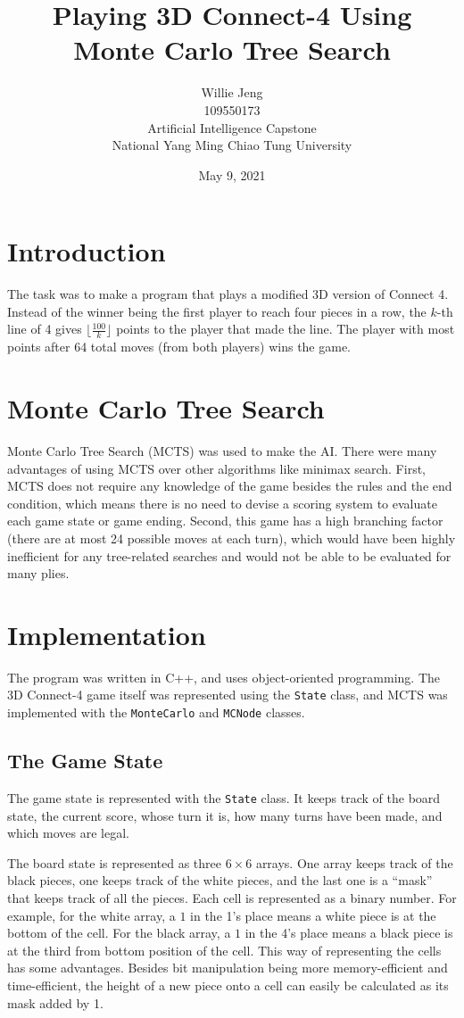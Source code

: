 \documentclass[12pt, a4paper]{article}
\title {
    Playing 3D Connect-4 Using\\
    Monte Carlo Tree Search
}
\author {
    Willie Jeng\\
    109550173\\
    Artificial Intelligence Capstone\\
    National Yang Ming Chiao Tung University\\
}
\date{May 9, 2021}
\begin{document}
    \maketitle

    \section{Introduction}

    The task was to make a program that plays a modified 3D version of Connect 4. Instead of the winner being the first player to reach four pieces in a row, the $k$-th line of 4 gives $\lfloor\frac{100}{k}\rfloor$ points to the player that made the line. The player with most points after 64 total moves (from both players) wins the game. 

    \section{Monte Carlo Tree Search}

    Monte Carlo Tree Search (MCTS) was used to make the AI. There were many advantages of using MCTS over other algorithms like minimax search. First, MCTS does not require any knowledge of the game besides the rules and the end condition, which means there is no need to devise a scoring system to evaluate each game state or game ending. Second, this game has a high branching factor (there are at most 24 possible moves at each turn), which would have been highly inefficient for any tree-related searches and would not be able to be evaluated for many plies.

    \section{Implementation}

    The program was written in C++, and uses object-oriented programming. The 3D Connect-4 game itself was represented using the {\tt State} class, and MCTS was implemented with the {\tt MonteCarlo} and {\tt MCNode} classes.

    \subsection{The Game State}
    The game state is represented with the {\tt State} class. It keeps track of the board state, the current score, whose turn it is, how many turns have been made, and which moves are legal. 

    The board state is represented as three $6\times6$ arrays. One array keeps track of the black pieces, one keeps track of the white pieces, and the last one is a ``mask'' that keeps track of all the pieces. Each cell is represented as a binary number. For example, for the white array, a $1$ in the 1's place means a white piece is at the bottom of the cell. For the black array, a $1$ in the 4's place means a black piece is at the third from bottom position of the cell. This way of representing the cells has some advantages. Besides bit manipulation being more memory-efficient and time-efficient, the height of a new piece onto a cell can easily be calculated as its mask added by 1.
\end{document}
